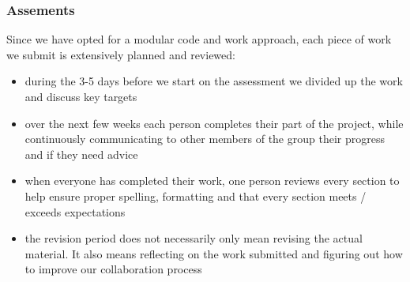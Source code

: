 \documentclass[coverpage,lineno]{../custom}
\begin{document}
\subsubsection{Assements}
Since we have opted for a modular code and work approach, each piece of work we submit is extensively planned and reviewed:
\begin{itemize}
    \item during the 3-5 days before we start on the assessment we divided up the work and discuss key targets 
    \item over the next few weeks each person completes their part of the project, while continuously communicating to other members of the group their progress and if they need advice
    \item when everyone has completed their work, one person reviews every section to help ensure proper spelling, formatting and that every section meets / exceeds expectations \\ 
    \item the revision period does not necessarily only mean revising the actual material. It also means reflecting on the work submitted and figuring out how to improve our collaboration process
    
\end{itemize}
\end{document}
